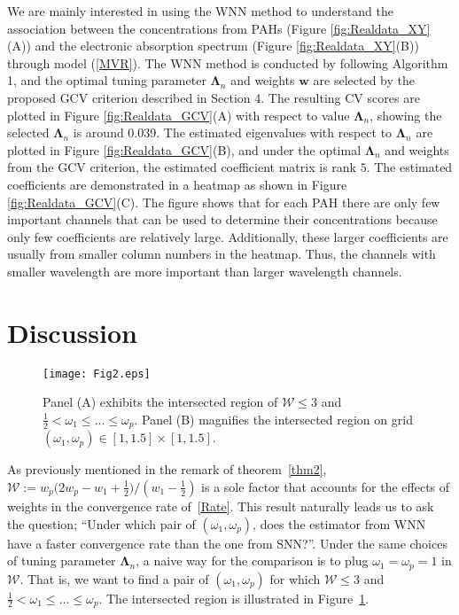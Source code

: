 \documentclass[12pt]{article}
\begin{document}
We are mainly interested in using the WNN method to understand the association between the concentrations from PAHs (Figure 
\ref{fig:Realdata_XY}(A)) and the electronic absorption spectrum  (Figure \ref{fig:Realdata_XY}(B)) through model (\ref{MVR}). The WNN method is conducted by following Algorithm 1, and the optimal tuning parameter $\boldsymbol{\Lambda}_{n}$ and weights $\boldsymbol{w}$ are selected by the proposed GCV criterion described in Section 4. The resulting CV scores are plotted in Figure \ref{fig:Realdata_GCV}(A) with respect to value $\boldsymbol{\Lambda}_{n}$,  showing the selected $\boldsymbol{\Lambda}_{n}$ is around 0.039. The estimated eigenvalues with respect to $\boldsymbol{\Lambda}_{n}$ are plotted in Figure \ref{fig:Realdata_GCV}(B), and under the optimal $\boldsymbol{\Lambda}_{n}$ and weights from the GCV criterion, the estimated coefficient matrix is rank $5$. The estimated coefficients are demonstrated in a heatmap as shown in Figure \ref{fig:Realdata_GCV}(C). The figure shows that for each PAH there are only few important channels that can be used to determine their concentrations because only few coefficients are relatively large. Additionally, these larger coefficients are usually from smaller column numbers in the heatmap. Thus, the channels with smaller wavelength are more important than larger wavelength channels.

\section{Discussion} \label{Disc}
\begin{figure} [hbt!]
  \hspace*{-1.4cm}                  
  \texttt{[image: Fig2.eps]}
  \centering
  \caption{ Panel (A) exhibits the intersected region of $\mathcal{W} \leq 3$ and $\frac{1}{2} < \omega_{1} \leq \dots \leq \omega_{p}$. Panel (B) magnifies the intersected region on grid $(\omega_{1},\omega_{p})\in[1,1.5] \times [1,1.5]$. }
  \label{Fig2}
\end{figure}

As previously mentioned in the remark of theorem~\ref{thm2}, $\mathcal{W}:= w_{p}\big(2w_{p}-w_{1}+\frac{1}{2}\big)/(w_{1}-\frac{1}{2})$ is a sole factor that accounts for the effects of weights in the convergence rate of~\eqref{Rate}.
This result naturally leads us to ask the question; ``Under which pair of $(\omega_{1},\omega_{p})$, does the estimator from WNN have a faster convergence rate than the one from SNN?''.
Under the same choices of tuning parameter $\boldsymbol{\Lambda}_{n}$, a naive way for the comparison is to plug $\omega_{1}=\omega_{p}=1$ in $\mathcal{W}$. 
That is, we want to find a pair of $(\omega_{1},\omega_{p})$ for which $\mathcal{W} \leq 3$ and $\frac{1}{2} < \omega_{1} \leq \dots \leq \omega_{p}$.
The intersected region is illustrated in Figure~\ref{Fig2}.
\end{document}
